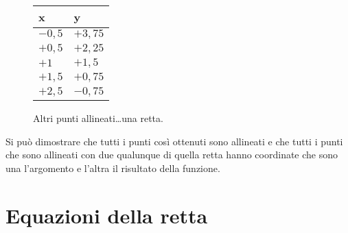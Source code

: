 \begin{inaccessibleblock}
 \begin{figure}[h]
\centering \hspace{-5mm}
 \begin{minipage}[]{.24\textwidth}
  \begin{center}
   \begin{tabular}{l|l}
    \quad x   & \quad y \\
    \hline
    \(-0,5\) & \(+3,75\) \\
    \(+0,5\) & \(+2,25\) \\
    \(+1\)   & \(+1,5\)  \\
    \(+1,5\) & \(+0,75\) \\
    \(+2,5\) & \(-0,75\)
   \end{tabular}
  \end{center}
 \end{minipage}
 \hfill
 \begin{minipage}[]{.34\textwidth}
 \altripunti
 \end{minipage}
 \hfill
 \begin{minipage}[]{.40\textwidth}
 \rettaa
 \end{minipage}
  \caption{Altri punti allineati\dots una retta.}\label{fig:altripunti}
\end{figure}
\end{inaccessibleblock}

Si può dimostrare che tutti i punti così ottenuti sono allineati 
e che tutti i punti che sono allineati con due qualunque di quella retta 
hanno coordinate che sono una l'argomento e l'altra il risultato della 
funzione. 

% 

\section{Equazioni della retta}
\label{sec:retta_equazioni}

